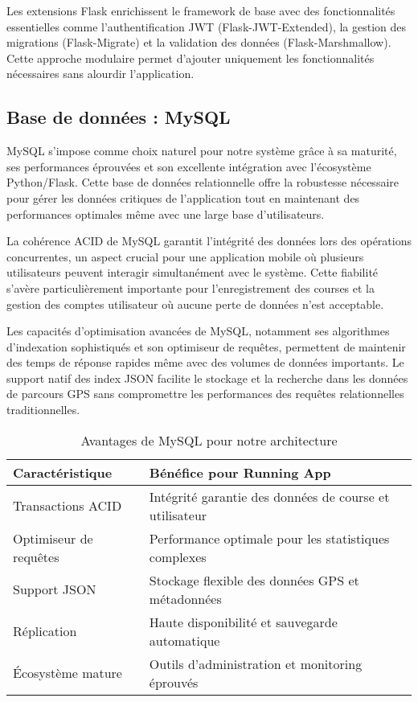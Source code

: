 Les extensions Flask enrichissent le framework de base avec des fonctionnalités essentielles comme l'authentification JWT (Flask-JWT-Extended), la gestion des migrations (Flask-Migrate) et la validation des données (Flask-Marshmallow). Cette approche modulaire permet d'ajouter uniquement les fonctionnalités nécessaires sans alourdir l'application.

\subsection{Base de données : MySQL}

MySQL s'impose comme choix naturel pour notre système grâce à sa maturité, ses performances éprouvées et son excellente intégration avec l'écosystème Python/Flask. Cette base de données relationnelle offre la robustesse nécessaire pour gérer les données critiques de l'application tout en maintenant des performances optimales même avec une large base d'utilisateurs.

La cohérence ACID de MySQL garantit l'intégrité des données lors des opérations concurrentes, un aspect crucial pour une application mobile où plusieurs utilisateurs peuvent interagir simultanément avec le système. Cette fiabilité s'avère particulièrement importante pour l'enregistrement des courses et la gestion des comptes utilisateur où aucune perte de données n'est acceptable.

Les capacités d'optimisation avancées de MySQL, notamment ses algorithmes d'indexation sophistiqués et son optimiseur de requêtes, permettent de maintenir des temps de réponse rapides même avec des volumes de données importants. Le support natif des index JSON facilite le stockage et la recherche dans les données de parcours GPS sans compromettre les performances des requêtes relationnelles traditionnelles.

\begin{table}[h]
\centering
\begin{tabular}{|l|p{10cm}|}
\hline
\textbf{Caractéristique} & \textbf{Bénéfice pour Running App} \\
\hline
Transactions ACID & Intégrité garantie des données de course et utilisateur \\
\hline
Optimiseur de requêtes & Performance optimale pour les statistiques complexes \\
\hline
Support JSON & Stockage flexible des données GPS et métadonnées \\
\hline
Réplication & Haute disponibilité et sauvegarde automatique \\
\hline
Écosystème mature & Outils d'administration et monitoring éprouvés \\
\hline
\end{tabular}
\caption{Avantages de MySQL pour notre architecture}
\end{table}

